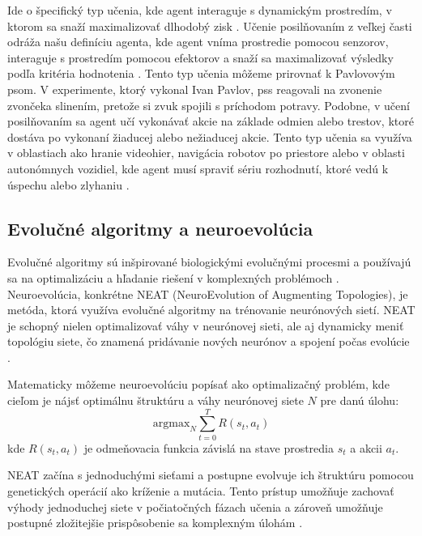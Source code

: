 \begin{enumerate}
Ide o špecifický typ učenia, kde agent interaguje s dynamickým prostredím, v ktorom sa snaží maximalizovať dlhodobý zisk \cite{reinforcment_learning_intro}. Učenie posilňovaním z veľkej časti odráža našu definíciu agenta, kde agent vníma prostredie pomocou senzorov, interaguje s prostredím pomocou efektorov a snaží sa maximalizovať výsledky podľa kritéria hodnotenia \cite{artificial_intelligence_modern_aproach}. 
Tento typ učenia môžeme prirovnať k Pavlovovým psom. V experimente, ktorý vykonal Ivan Pavlov, pss reagovali na zvonenie zvončeka slinením, pretože si zvuk spojili s príchodom potravy. Podobne, v učení posilňovaním sa agent učí vykonávať akcie na základe odmien alebo trestov, ktoré dostáva po vykonaní žiaducej alebo nežiaducej akcie. Tento typ učenia sa využíva v oblastiach ako hranie videohier, navigácia robotov po priestore alebo v oblasti autonómnych vozidiel, kde agent musí spraviť sériu rozhodnutí, ktoré vedú k úspechu alebo zlyhaniu \cite{reinforcment_learning_intro}.

\end{enumerate}

\subsection{Evolučné algoritmy a neuroevolúcia}

Evolučné algoritmy sú inšpirované biologickými evolučnými procesmi a používajú sa na optimalizáciu a hľadanie riešení v komplexných problémoch \cite{artificial_intelligence_modern_aproach}. Neuroevolúcia, konkrétne NEAT (NeuroEvolution of Augmenting Topologies), je metóda, ktorá využíva evolučné algoritmy na trénovanie neurónových sietí. NEAT je schopný nielen optimalizovať váhy v neurónovej sieti, ale aj dynamicky meniť topológiu siete, čo znamená pridávanie nových neurónov a spojení počas evolúcie \cite{neat_article}.

Matematicky môžeme neuroevolúciu popísať ako optimalizačný problém, kde cieľom je nájsť optimálnu štruktúru a váhy neurónovej siete $N$ pre danú úlohu:
\[
\text{argmax}_{N} \sum_{t=0}^{T} R(s_t, a_t)
\]
kde $R(s_t, a_t)$ je odmeňovacia funkcia závislá na stave prostredia $s_t$ a akcii $a_t$.

NEAT začína s jednoduchými sieťami a postupne evolvuje ich štruktúru pomocou genetických operácií ako kríženie a mutácia. Tento prístup umožňuje zachovať výhody jednoduchej siete v počiatočných fázach učenia a zároveň umožňuje postupné zložitejšie prispôsobenie sa komplexným úlohám \cite{neat_article}.



